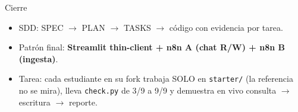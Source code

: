 \documentclass[aspectratio=169,11pt]{beamer}
\begin{document}
\begin{frame}{Cierre}
  \begin{itemize}
    \item SDD: SPEC $\to$ PLAN $\to$ TASKS $\to$ código con evidencia por tarea.
    \item Patrón final: \textbf{Streamlit thin-client + n8n A (chat R/W) + n8n B (ingesta)}.
    \item Tarea: cada estudiante en su fork trabaja SOLO en \texttt{starter/} (la referencia no se mira), lleva \texttt{check.py} de 3/9 a 9/9 y demuestra en vivo consulta $\to$ escritura $\to$ reporte.
  \end{itemize}
\end{frame}
\end{document}
